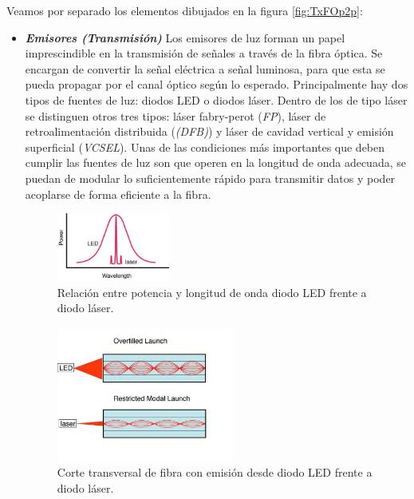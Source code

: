 \begin{itemize}
 Veamos por separado los elementos dibujados en la figura \ref{fig:TxFOp2p}:
 	\begin{itemize}
 		\item \textit{\textbf{Emisores (Transmisión)}}	
 		Los emisores de luz forman un papel imprescindible en la transmisión de señales a través de la fibra óptica. Se encargan de convertir la señal eléctrica a señal luminosa, para que esta se pueda propagar por el canal óptico según lo esperado. Principalmente hay dos tipos de fuentes de luz: diodos LED o diodos láser. Dentro de los de tipo láser se distinguen otros tres tipos: láser fabry-perot (\textit{FP}), láser de retroalimentación distribuida (\textit{(DFB)}) y láser de cavidad vertical y emisión superficial (\textit{VCSEL}). Unas de las condiciones más importantes que deben cumplir las fuentes de luz son que operen en la longitud de onda adecuada, se puedan de modular lo suficientemente rápido para transmitir datos y poder acoplarse de forma eficiente a la fibra. \cite{TransRecepFO}
 		
 		 \begin{figure}[H]
 			\centering
 			\includegraphics[width=0.35\textwidth]{./img/led-laser}
 			\caption{Relación entre potencia y longitud de onda diodo LED frente a diodo láser. \cite{FOA} } 
 			\label{fig:ledVsLaser}
 		\end{figure} 
 	 	\begin{figure}[H]
 			\centering
 			\includegraphics[width=0.55\textwidth]{./img/led-laserEMISION}
 			\caption{Corte transversal de fibra con emisión desde diodo LED frente a diodo láser. \cite{FOA} } 
 			\label{fig:corteledVsLaser}
 		\end{figure} 
 		

\end{itemize}
\end{itemize}
